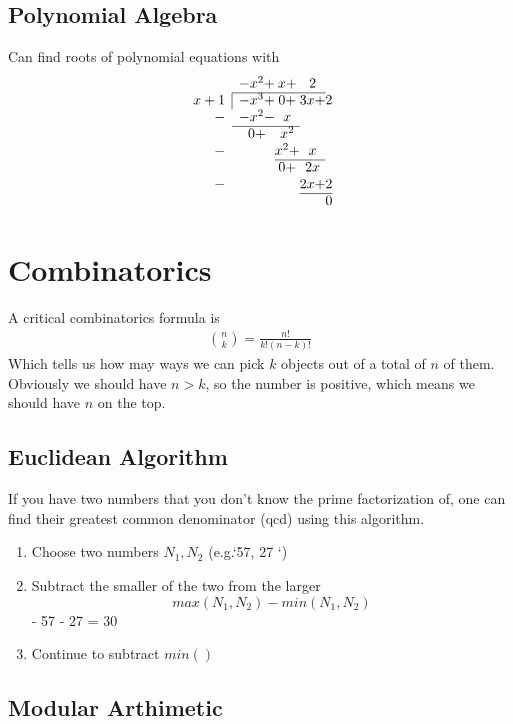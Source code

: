 \subsection{Polynomial Algebra}

Can find roots of polynomial equations with
$$
\begin{array}{rc@{}c@{}c@{}c@{}}
& -x^2 +& x + &2 & \\ \cline{2-4}
\multicolumn{1}{r|}{x+1} &-x^3+ & 0 + & 3x +&2\\
-&-x^2 -&x  &\\ \cline{2-3}
& 0 +& x^2 &\\ 
-&  & x^2 +&x\\ \cline{3-4}
& & 0 +&2x &\\ 
-& &  &2x +&2\\ \cline{4-5}
& & & &0\\
\end{array}
$$

\section{Combinatorics}
A critical combinatorics formula is 
\begin{align}
{{n}\choose{k}} = \frac{n!}{k!(n-k)!}
\end{align}
Which tells us how may ways we can pick $k$ objects out of a total of $n$ of them. Obviously we should have $n>k$, so the number is positive, which means we should have $n$ on the top.


\subsection{Euclidean Algorithm}

If you have two numbers that you don't know the prime factorization of, one can find their greatest common denominator (qcd) using this algorithm. 
\begin{enumerate}
\item Choose two numbers $N_1, N_2$ (e.g.`57, 27 `)
\item Subtract the smaller of the two from the larger $$max(N_1,N_2) - min(N_1,N_2)$$
    - 57 - 27 = 30
\item Continue to subtract $min()$
\end{enumerate}

\subsection{Modular Arthimetic}
